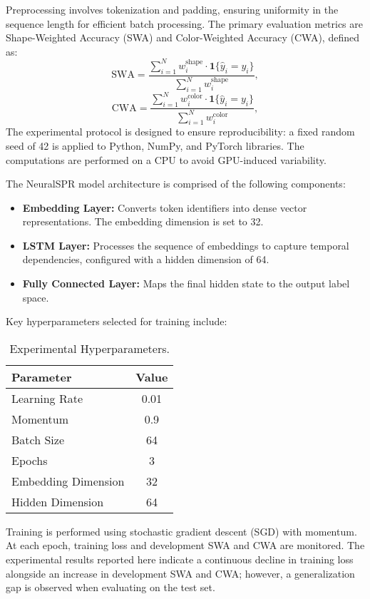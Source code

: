 \documentclass{article}
\begin{document}
Preprocessing involves tokenization and padding, ensuring uniformity in the sequence length for efficient batch processing. The primary evaluation metrics are Shape-Weighted Accuracy (SWA) and Color-Weighted Accuracy (CWA), defined as:
\[
\text{SWA} = \frac{\sum_{i=1}^{N} w_i^{\text{shape}} \cdot \mathbf{1}\{\hat{y}_i = y_i\}}{\sum_{i=1}^{N} w_i^{\text{shape}}},
\]
\[
\text{CWA} = \frac{\sum_{i=1}^{N} w_i^{\text{color}} \cdot \mathbf{1}\{\hat{y}_i = y_i\}}{\sum_{i=1}^{N} w_i^{\text{color}}},
\]
The experimental protocol is designed to ensure reproducibility: a fixed random seed of 42 is applied to Python, NumPy, and PyTorch libraries. The computations are performed on a CPU to avoid GPU-induced variability.

The NeuralSPR model architecture is comprised of the following components:
\begin{itemize}
    \item \textbf{Embedding Layer:} Converts token identifiers into dense vector representations. The embedding dimension is set to 32.
    \item \textbf{LSTM Layer:} Processes the sequence of embeddings to capture temporal dependencies, configured with a hidden dimension of 64.
    \item \textbf{Fully Connected Layer:} Maps the final hidden state to the output label space.
\end{itemize}

Key hyperparameters selected for training include:
\begin{table}[h]
\centering
\caption{Experimental Hyperparameters.}
\begin{tabular}{lc}
\hline
\textbf{Parameter} & \textbf{Value} \\
\hline
Learning Rate & 0.01 \\
Momentum & 0.9 \\
Batch Size & 64 \\
Epochs & 3 \\
Embedding Dimension & 32 \\
Hidden Dimension & 64 \\
\hline
\end{tabular}
\end{table}

Training is performed using stochastic gradient descent (SGD) with momentum. At each epoch, training loss and development SWA and CWA are monitored. The experimental results reported here indicate a continuous decline in training loss alongside an increase in development SWA and CWA; however, a generalization gap is observed when evaluating on the test set.
\end{document}
